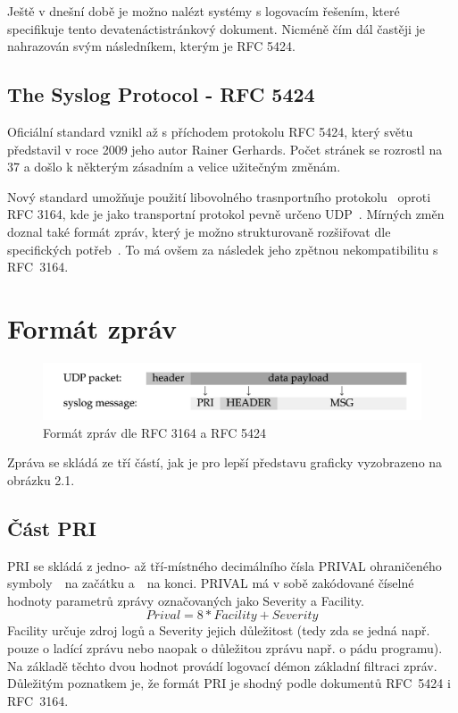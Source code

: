 \documentclass[thesis=B,czech]{FITthesis}[2012/06/26]
\begin{document}
Ještě v dnešní době je možno nalézt systémy s logovacím řešením, které specifikuje tento devatenáctistránkový dokument. Nicméně čím dál častěji je nahrazován svým následníkem, kterým je RFC 5424.

\subsection{The Syslog Protocol - RFC 5424}
Oficiální standard vznikl až s příchodem protokolu RFC 5424, který světu představil v roce 2009 jeho autor Rainer Gerhards. Počet stránek se rozrostl na 37 a došlo k některým zásadním a velice užitečným změnám.

Nový standard umožňuje použití libovolného trasnportního protokolu~\cite{RFC5424-TrProt} oproti RFC 3164, kde je jako transportní protokol pevně určeno UDP~\cite{RFC3164-UDP}.
Mírných změn doznal také formát zpráv, který je možno strukturovaně rozšiřovat dle specifických potřeb~\cite{RFC5424-MsgForm}. To má ovšem za následek jeho zpětnou nekompatibilitu s RFC~3164.

\section{Formát zpráv}
\begin{figure}[H]
	\centering
	\includegraphics[scale=0.3]{images/syslog-message-format}
	\caption[Formát zpráv dle RFC 3164 a RFC 5424]{Formát zpráv dle RFC 3164 a RFC 5424}
\end{figure}

Zpráva se skládá ze tří částí, jak je pro lepší představu graficky vyzobrazeno na obrázku 2.1.

\subsection{Část PRI}
PRI se skládá z jedno- až tří-místného decimálního čísla PRIVAL ohraničeného symboly~\uv{<}~na začátku a~\uv{>}~na konci.
PRIVAL má v sobě zakódované číselné hodnoty parametrů zprávy označovaných jako Severity a Facility.
$$Prival= 8*Facility+Severity$$
Facility určuje zdroj logů a Severity jejich důležitost (tedy zda se jedná např. pouze o ladící zprávu nebo naopak o důležitou zprávu např. o pádu programu). Na základě těchto dvou hodnot provádí logovací démon základní filtraci zpráv.
Důležitým poznatkem je, že formát PRI je shodný podle dokumentů RFC~5424 i RFC~3164.
\end{document}
